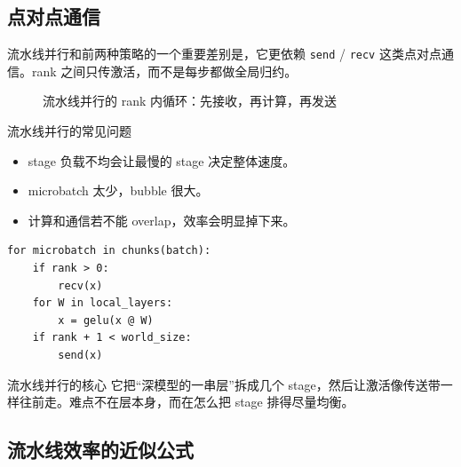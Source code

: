 \documentclass[a4paper]{article}
\begin{document}
\subsection{点对点通信}

流水线并行和前两种策略的一个重要差别是，它更依赖 \texttt{send} / \texttt{recv} 这类点对点通信。rank 之间只传激活，而不是每步都做全局归约。

\begin{figure}[H]
\centering
{}
\caption{流水线并行的 rank 内循环：先接收，再计算，再发送}
\end{figure}

\begin{warningbox}{流水线并行的常见问题}
\begin{itemize}
    \item stage 负载不均会让最慢的 stage 决定整体速度。
    \item microbatch 太少，bubble 很大。
    \item 计算和通信若不能 overlap，效率会明显掉下来。
\end{itemize}
\end{warningbox}

\begin{lstlisting}[caption={流水线并行的极简理解},label={lst:pp}]
for microbatch in chunks(batch):
    if rank > 0:
        recv(x)
    for W in local_layers:
        x = gelu(x @ W)
    if rank + 1 < world_size:
        send(x)
\end{lstlisting}

\begin{knowledgebox}{流水线并行的核心}
它把“深模型的一串层”拆成几个 stage，然后让激活像传送带一样往前走。难点不在层本身，而在怎么把 stage 排得尽量均衡。
\end{knowledgebox}

\subsection{流水线效率的近似公式}
\end{document}
